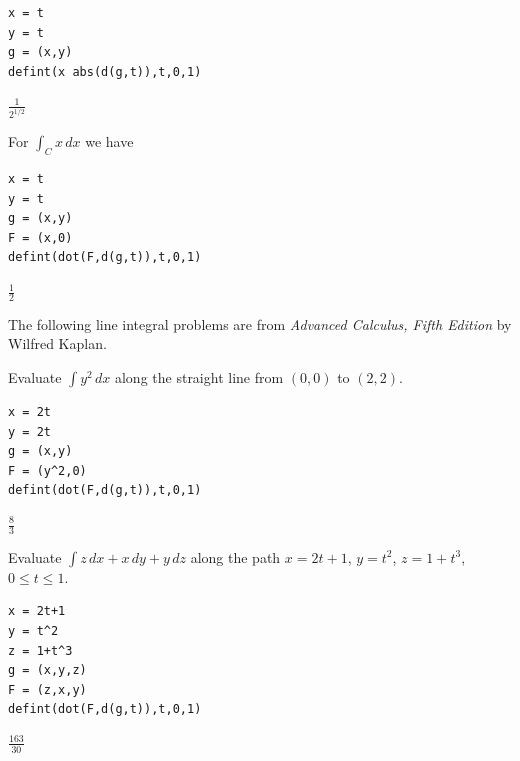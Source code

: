 \begin{Verbatim}[formatcom=\color{blue},samepage=true]
x = t
y = t
g = (x,y)
defint(x abs(d(g,t)),t,0,1)
\end{Verbatim}

\noindent
$\displaystyle \frac{1}{2^{1/2}}$

\bigskip
\noindent
For $\int_Cx\,dx$ we have

\begin{Verbatim}[formatcom=\color{blue},samepage=true]
x = t
y = t
g = (x,y)
F = (x,0)
defint(dot(F,d(g,t)),t,0,1)
\end{Verbatim}

\noindent
$\displaystyle \tfrac{1}{2}$

\bigskip
\noindent
The following line integral problems are from
{\it Advanced Calculus, Fifth Edition} by Wilfred Kaplan.

\bigskip
\noindent
Evaluate $\int y^2\,dx$ along the straight
line from $(0,0)$ to $(2,2)$.

\begin{Verbatim}[formatcom=\color{blue},samepage=true]
x = 2t
y = 2t
g = (x,y)
F = (y^2,0)
defint(dot(F,d(g,t)),t,0,1)
\end{Verbatim}

\noindent
$\displaystyle \tfrac{8}{3}$

\bigskip
\noindent
Evaluate $\int z\,dx+x\,dy+y\,dz$
along the path
$x=2t+1$, $y=t^2$, $z=1+t^3$, $0\le t\le 1$.

\begin{Verbatim}[formatcom=\color{blue},samepage=true]
x = 2t+1
y = t^2
z = 1+t^3
g = (x,y,z)
F = (z,x,y)
defint(dot(F,d(g,t)),t,0,1)
\end{Verbatim}

\noindent
$\displaystyle \tfrac{163}{30}$
